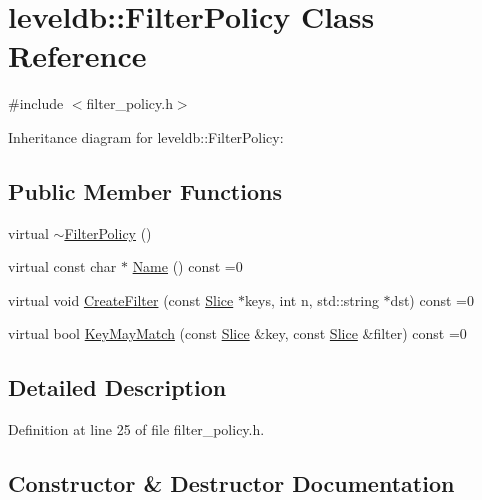 \hypertarget{classleveldb_1_1_filter_policy}{}\section{leveldb\+:\+:Filter\+Policy Class Reference}
\label{classleveldb_1_1_filter_policy}


{\ttfamily \#include $<$filter\+\_\+policy.\+h$>$}



Inheritance diagram for leveldb\+:\+:Filter\+Policy\+:
\subsection*{Public Member Functions}
\begin{DoxyCompactItemize}
\item 
virtual \hyperlink{classleveldb_1_1_filter_policy_a4134b35d7dd640c7c6f182bf7305f158}{$\sim$\+Filter\+Policy} ()
\item 
virtual const char $\ast$ \hyperlink{classleveldb_1_1_filter_policy_afd5e951892a2e740f186c0658913ea1b}{Name} () const =0
\item 
virtual void \hyperlink{classleveldb_1_1_filter_policy_a355e9797e16dd16b93d19056781126b2}{Create\+Filter} (const \hyperlink{classleveldb_1_1_slice}{Slice} $\ast$keys, int n, std\+::string $\ast$dst) const =0
\item 
virtual bool \hyperlink{classleveldb_1_1_filter_policy_a6f8ba10ea25e0b4b8d0a6607c361c718}{Key\+May\+Match} (const \hyperlink{classleveldb_1_1_slice}{Slice} \&key, const \hyperlink{classleveldb_1_1_slice}{Slice} \&filter) const =0
\end{DoxyCompactItemize}


\subsection{Detailed Description}


Definition at line 25 of file filter\+\_\+policy.\+h.



\subsection{Constructor \& Destructor Documentation}
\hypertarget{classleveldb_1_1_filter_policy_a4134b35d7dd640c7c6f182bf7305f158}{}
